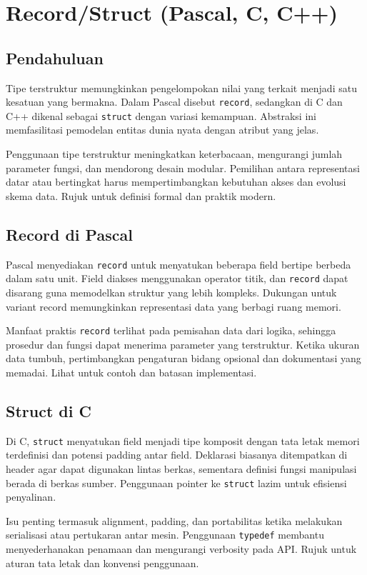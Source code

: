 \documentclass[../main.tex]{subfiles}
\begin{document}
\chapter{Record/Struct (Pascal, C, C++)}
\section{Pendahuluan}
Tipe terstruktur memungkinkan pengelompokan nilai yang terkait menjadi satu kesatuan yang bermakna. Dalam Pascal disebut \texttt{record}, sedangkan di C dan C++ dikenal sebagai \texttt{struct} dengan variasi kemampuan. Abstraksi ini memfasilitasi pemodelan entitas dunia nyata dengan atribut yang jelas.

Penggunaan tipe terstruktur meningkatkan keterbacaan, mengurangi jumlah parameter fungsi, dan mendorong desain modular. Pemilihan antara representasi datar atau bertingkat harus mempertimbangkan kebutuhan akses dan evolusi skema data. Rujuk \textcite{pascal-structs,c-struct,cpp-struct-class} untuk definisi formal dan praktik modern.

\section{Record di Pascal}
Pascal menyediakan \texttt{record} untuk menyatukan beberapa field bertipe berbeda dalam satu unit. Field diakses menggunakan operator titik, dan \texttt{record} dapat disarang guna memodelkan struktur yang lebih kompleks. Dukungan untuk variant record memungkinkan representasi data yang berbagi ruang memori.

Manfaat praktis \texttt{record} terlihat pada pemisahan data dari logika, sehingga prosedur dan fungsi dapat menerima parameter yang terstruktur. Ketika ukuran data tumbuh, pertimbangkan pengaturan bidang opsional dan dokumentasi yang memadai. Lihat \textcite{pascal-structs,free-pascal-docs} untuk contoh dan batasan implementasi.

\section{Struct di C}
Di C, \texttt{struct} menyatukan field menjadi tipe komposit dengan tata letak memori terdefinisi dan potensi padding antar field. Deklarasi biasanya ditempatkan di header agar dapat digunakan lintas berkas, sementara definisi fungsi manipulasi berada di berkas sumber. Penggunaan pointer ke \texttt{struct} lazim untuk efisiensi penyalinan.

Isu penting termasuk alignment, padding, dan portabilitas ketika melakukan serialisasi atau pertukaran antar mesin. Penggunaan \texttt{typedef} membantu menyederhanakan penamaan dan mengurangi verbosity pada API. Rujuk \textcite{c-struct,gnu-c-manual} untuk aturan tata letak dan konvensi penggunaan.
\end{document}
